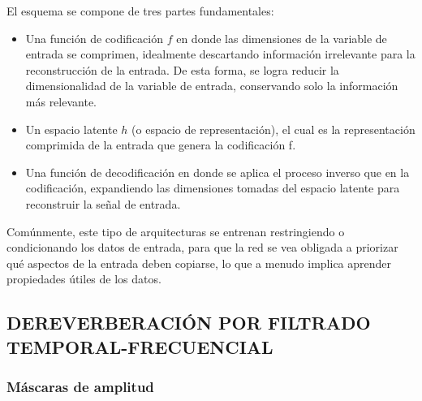 El esquema  se compone de tres partes fundamentales: 
\begin{itemize}
\item Una función de codificación $f$ en donde las dimensiones de la variable de entrada se comprimen, idealmente descartando información irrelevante para la reconstrucción de la entrada. De esta forma, se logra reducir la dimensionalidad de la variable de entrada, conservando solo la información más relevante.

\item Un espacio latente $h$ (o espacio de representación), el cual es la representación comprimida de la entrada que genera la codificación f.

\item Una función de decodificación en donde se aplica el proceso inverso que en la codificación, expandiendo las dimensiones tomadas del espacio latente para reconstruir la señal de entrada. 
\end{itemize}

Comúnmente, este tipo de arquitecturas se entrenan restringiendo o condicionando los datos de entrada, para que la red se vea obligada a priorizar qué aspectos de la entrada deben copiarse, lo que a menudo implica aprender propiedades útiles de los datos.



\subsection[Dereverberación por filtrado temporal-frecuencial]{DEREVERBERACIÓN POR FILTRADO TEMPORAL-FRECUENCIAL}

\subsubsection{Máscaras de amplitud}

